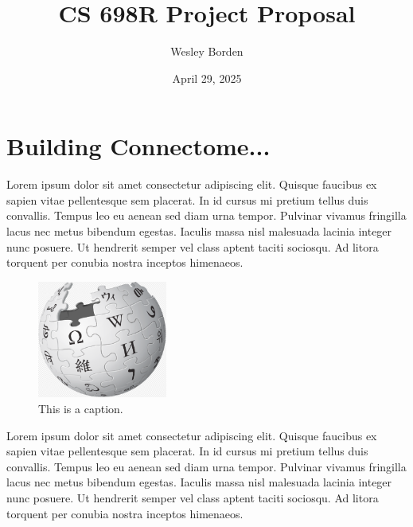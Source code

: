 \documentclass[12pt]{article}
\title{CS 698R Project Proposal}
\author{Wesley Borden}
\date{April 29, 2025}
\newcommand{\sectionwithindent}[1]{%
    \section*{#1}%
    \hspace{\parindent} %
}
\begin{document}

\sectionwithindent{Building Connectome...}
Lorem ipsum dolor sit amet consectetur adipiscing elit. Quisque faucibus ex sapien vitae pellentesque sem placerat. In id cursus mi pretium tellus duis convallis. Tempus leo eu aenean sed diam urna tempor. Pulvinar vivamus fringilla lacus nec metus bibendum egestas. Iaculis massa nisl malesuada lacinia integer nunc posuere. Ut hendrerit semper vel class aptent taciti sociosqu. Ad litora torquent per conubia nostra inceptos himenaeos.

\begin{figure}
    \centering
    \includegraphics[width=0.38\textwidth]{wiki.png}
    \caption{This is a caption.}
    \label{fig:analogy}
\end{figure}

Lorem ipsum dolor sit amet consectetur adipiscing elit. Quisque faucibus ex sapien vitae pellentesque sem placerat. In id cursus mi pretium tellus duis convallis. Tempus leo eu aenean sed diam urna tempor. Pulvinar vivamus fringilla lacus nec metus bibendum egestas. Iaculis massa nisl malesuada lacinia integer nunc posuere. Ut hendrerit semper vel class aptent taciti sociosqu. Ad litora torquent per conubia nostra inceptos himenaeos.
\end{document}
